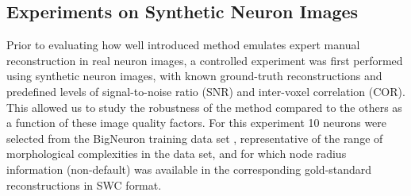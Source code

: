 \subsection{Experiments on Synthetic Neuron Images}
\label{subsec:eval-sim}
Prior to evaluating how well introduced method emulates expert manual reconstruction in real neuron images, a controlled experiment was first performed using synthetic neuron images, with known ground-truth reconstructions and predefined levels of signal-to-noise ratio (SNR) and inter-voxel correlation (COR). This allowed us to study the robustness of the method compared to the others as a function of these image quality factors. For this experiment 10 neurons were selected from the BigNeuron training data set \cite{peng2015bigneuron}, representative of the range of morphological complexities in the data set, and for which node radius information (non-default) was available in the corresponding gold-standard reconstructions in SWC format.
